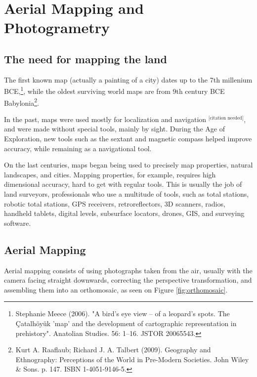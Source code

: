

\chapter{Aerial Mapping and Photogrametry} \label{chap:2}



\section{The need for mapping the land}
The first known map (actually a painting of a city) dates up to the 7th millenium BCE,\footnote{Stephanie Meece (2006). "A bird's eye view – of a leopard's spots. The Çatalhöyük 'map' and the development of cartographic representation in prehistory". Anatolian Studies. 56: 1–16. JSTOR 20065543.
}, while the oldest surviving world maps are from 9th century BCE Babylonia\footnote{ Kurt A. Raaflaub; Richard J. A. Talbert (2009). Geography and Ethnography: Perceptions of the World in Pre-Modern Societies. John Wiley & Sons. p. 147. ISBN 1-4051-9146-5.}.

In the past, maps were used mostly for localization and navigation $^{\text{[citation needed]}}$, and were made without special tools, mainly by sight. During the Age of Exploration, new tools such as the sextant and magnetic compass helped improve accuracy, while remaining as a navigational tool.

On the last centuries, maps began being used to precisely map properties, natural landscapes, and cities. Mapping properties, for example, requires high dimensional accuracy, hard to get with regular tools. This is usually the job of land surveyors, professionals who use a multitude of tools, such as total stations, robotic total stations, GPS receivers, retroreflectors, 3D scanners, radios, handheld tablets, digital levels, subsurface locators, drones, GIS, and surveying software.


\section{Aerial Mapping}
Aerial mapping consists of using photographs taken from the air, usually with the camera facing straight downwards, correcting the perspective transformation, and assembling them into an orthomosaic, as seen on Figure \ref{fig:orthomosaic}.

